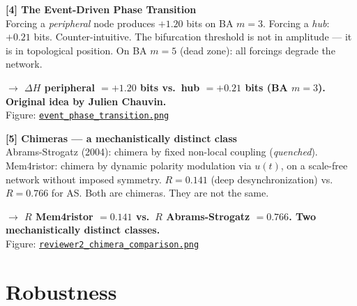 \documentclass[11pt, a4paper]{article}
\newcommand{\result}[1]{\textbf{\color{positive}#1}}
\begin{document}
\vspace{0.5em}

\begin{finding}
\textbf{[4] The Event-Driven Phase Transition}\\
Forcing a \textit{peripheral} node produces $+1.20$ bits on BA $m=3$. Forcing a \textit{hub}:
$+0.21$ bits. Counter-intuitive. The bifurcation threshold is not in amplitude --- it is in
topological position. On BA $m=5$ (dead zone): all forcings degrade the network.

\result{$\rightarrow$ $\Delta H$ peripheral $= +1.20$ bits vs.\ hub $= +0.21$ bits (BA $m=3$). Original idea by Julien Chauvin.}\\
Figure: \href{https://github.com/cafe-virtuel/Mem4ristor/blob/main/figures/event_phase_transition.png}{\texttt{event\_phase\_transition.png}}
\end{finding}

\vspace{0.5em}

\begin{finding}
\textbf{[5] Chimeras --- a mechanistically distinct class}\\
Abrams-Strogatz (2004): chimera by fixed non-local coupling (\textit{quenched}). Mem4ristor: chimera
by dynamic polarity modulation via $u(t)$, on a scale-free network without imposed symmetry.
$R = 0.141$ (deep desynchronization) vs.\ $R = 0.766$ for AS. Both are chimeras. They are not the
same.

\result{$\rightarrow$ $R$ Mem4ristor $= 0.141$ vs.\ $R$ Abrams-Strogatz $= 0.766$. Two mechanistically distinct classes.}\\
Figure: \href{https://github.com/cafe-virtuel/Mem4ristor/blob/main/figures/reviewer2_chimera_comparison.png}{\texttt{reviewer2\_chimera\_comparison.png}}
\end{finding}

\section{Robustness}
\end{document}
